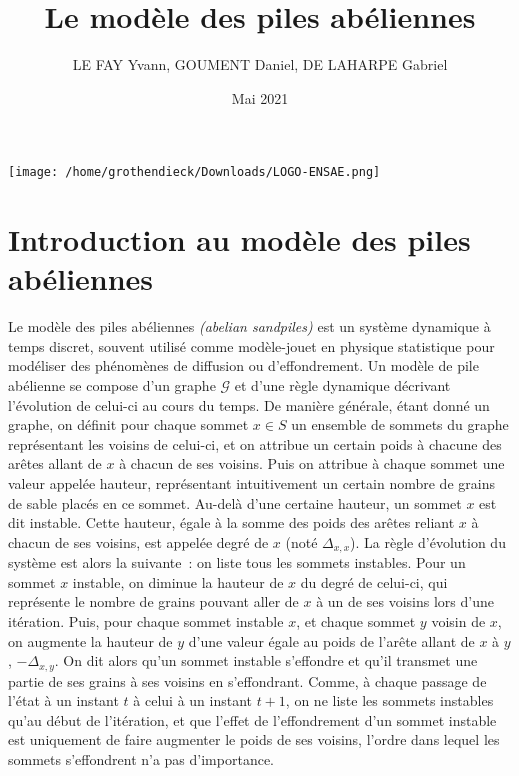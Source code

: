 \documentclass{article}
\begin{document}
\title{Le modèle des piles abéliennes}
\author{LE FAY Yvann, GOUMENT Daniel, DE LAHARPE Gabriel}
\date{Mai 2021}
\maketitle
\begin{center}
	\texttt{[image: /home/grothendieck/Downloads/LOGO-ENSAE.png]}
\end{center}
\newpage
\section{Introduction au modèle des piles abéliennes}
 
Le modèle des piles abéliennes \textit{(abelian sandpiles)} est un système dynamique à temps discret, souvent utilisé comme modèle-jouet en physique statistique pour modéliser des phénomènes de diffusion ou d'effondrement. Un modèle de pile abélienne se compose d'un graphe $\mathcal{G}$ et d'une règle dynamique décrivant l'évolution de celui-ci au cours du temps. De manière générale, étant donné un graphe, on définit pour chaque sommet $x\in S$ un ensemble de sommets du graphe représentant les voisins de celui-ci, et on attribue un certain poids à chacune des arêtes allant de $x$ à chacun de ses voisins. Puis on attribue à chaque sommet une valeur appelée hauteur, représentant intuitivement un certain nombre de grains de sable placés en ce sommet. Au-delà d'une certaine hauteur, un sommet $x$ est dit instable. Cette hauteur, égale à la somme des poids des arêtes reliant $x$ à chacun de ses voisins, est appelée degré de $x$ (noté $\Delta_{x,x}$). La règle d’évolution du système est alors la suivante : on liste tous les sommets instables. Pour un sommet $x$ instable, on diminue la hauteur de $x$ du degré de celui-ci, qui représente le nombre de grains pouvant aller de $x$ à un de ses voisins lors d'une itération. Puis, pour chaque sommet instable $x$, et chaque sommet $y$ voisin de $x$, on augmente la hauteur de $y$ d'une valeur égale au poids de l'arête allant de $x$ à $y$, $-\Delta_{x,y}$. On dit alors qu'un sommet instable s'effondre et qu'il transmet une partie de ses grains à ses voisins en s'effondrant. Comme, à chaque passage de l'état à un instant $t$ à celui à un instant $t+1$, on ne liste les sommets instables qu'au début de l'itération, et que l'effet de l'effondrement d'un sommet instable est uniquement de faire augmenter le poids de ses voisins, l'ordre dans lequel les sommets s'effondrent n'a pas d'importance.
\newline
\end{document}
